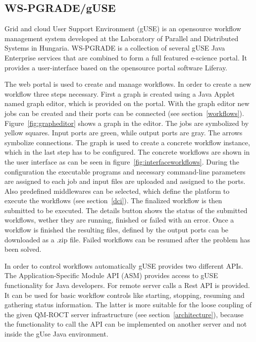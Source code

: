 \subsection{WS-PGRADE/gUSE}\label{guse}

Grid and cloud User Support Environment (gUSE) is an opensource workflow management system developed at the Laboratory of Parallel and Distributed Systems in Hungaria.
WS-PGRADE is a collection of several gUSE Java Enterprise services that are combined to form a full featured e-science portal.
It provides a user-interface based on the opensource portal software Liferay.

The web portal is used to create and manage workflows. In order to create a new workflow three steps necessary. First a graph is created using a Java Applet named graph editor, which is provided on the portal. With the graph editor new jobs can be created and their ports can be connected (see section~\ref{workflows}). Figure~\ref{fig:grapheditor} shows a graph in the editor. The jobs are symbolized by yellow squares. Input ports are green, while output ports are gray. The arrows symbolize connections.
The graph is used to create a concrete workflow instance, which in the last step has to be configured.
The concrete workflows are shown in the user interface as can be seen in figure~\ref{fig:interfaceworkflows}.
During the configuration the executable programs and necessary command-line parameters are assigned to each job and input files are uploaded and assigned to the ports.
Also predefined middlewares can be selected, which define the platform to execute the workflows (see section~\ref{dci}).
The finalized workflow is then submitted to be executed.
The details button shows the status of the submitted workflows, wether they are running, finished or failed with an error.
Once a workflow is finished the resulting files, defined by the output ports can be downloaded as a .zip file.
Failed workflows can be resumed after the problem has been solved.

In order to control workflows automatically gUSE provides two different APIs.
The Application-Specific Module API (ASM) provides access to gUSE functionality for Java developers.
For remote server calls a Rest API is provided. It can be used for basic workflow controls like starting, stopping, resuming and gathering status information.
The latter is more suitable for the loose coupling of the given QM-ROCT server infrastructure (see section~\ref{architecture}), because the functionality to call the API can be implemented on another server and not inside the gUse Java environment.

